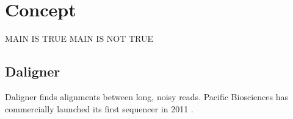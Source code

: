 \documentclass[../thesis.tex]{../ce}
\begin{document}
\chapter{Concept}
\ifdefined\main
\acresetall
MAIN IS TRUE
\else
MAIN IS NOT TRUE
\fi

\section{Daligner}
Daligner finds alignments between long, noisy reads.
Pacific Biosciences has commercially launched its first  sequencer in 2011 \cite{PBlaunch1}.
\end{document}
